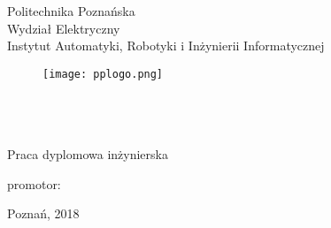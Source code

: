 \thispagestyle{empty}
\setcounter{page}{0}
\begin{center}
	\vspace{-5mm}
Politechnika Poznańska\\
Wydział Elektryczny\\  
Instytut Automatyki, Robotyki i Inżynierii Informatycznej\\
  \vspace{3mm}
\begin{figure}[ht!]
\centering
\texttt{[image: pplogo.png]}
\end{figure}
  \vspace{3mm}
\large{\StudentA}\\
\large{\StudentB}\\
  \vspace{10mm}
\large{\TytulPolski}\\
  \vspace{10mm}
\large{Praca dyplomowa inżynierska}\\
\end{center}
\vspace{40mm}
\begin{flushright}
promotor:\\
\Promotor
\end{flushright}

\vspace{5mm}
\begin{center}
Poznań, 2018
\end{center}
 

